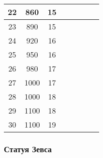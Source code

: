 \begin{longtable}[c]{|c|c|c|c|c|c|c|c|}
    \multirow{1}{*}{22} & \multirow{1}{*}{860} & \multirow{1}{*}{15} & & & & & \\\hline
    \multirow{1}{*}{23} & \multirow{1}{*}{890} & \multirow{1}{*}{15} & & & & & \\\hline
    \multirow{1}{*}{24} & \multirow{1}{*}{920} & \multirow{1}{*}{16} & & & & & \\\hline
    \multirow{1}{*}{25} & \multirow{1}{*}{950} & \multirow{1}{*}{16} & & & & & \\\hline
    \multirow{1}{*}{26} & \multirow{1}{*}{980} & \multirow{1}{*}{17} & & & & & \\\hline
    \multirow{1}{*}{27} & \multirow{1}{*}{1000} & \multirow{1}{*}{17} & & & & & \\\hline
    \multirow{1}{*}{28} & \multirow{1}{*}{1000} & \multirow{1}{*}{18} & & & & & \\\hline
    \multirow{1}{*}{29} & \multirow{1}{*}{1100} & \multirow{1}{*}{18} & & & & & \\\hline
    \multirow{1}{*}{30} & \multirow{1}{*}{1100} & \multirow{1}{*}{19} & & & & & \\\hline
\end{longtable}


\subsubsection{Статуя Зевса}

